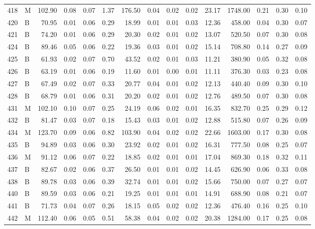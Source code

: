 \begin{table}[ht]
\begin{tabular}{rlrrrrrrrrrrrrr}
  418 & M & 102.90 & 0.08 & 0.07 & 1.37 & 176.50 & 0.04 & 0.02 & 0.02 & 23.17 & 1748.00 & 0.21 & 0.30 & 0.10 \\ 
  420 & B & 70.95 & 0.01 & 0.06 & 0.29 & 18.99 & 0.01 & 0.01 & 0.03 & 12.36 & 458.00 & 0.04 & 0.30 & 0.07 \\ 
  421 & B & 74.20 & 0.01 & 0.06 & 0.29 & 20.30 & 0.02 & 0.01 & 0.02 & 13.07 & 520.50 & 0.07 & 0.30 & 0.08 \\ 
  424 & B & 89.46 & 0.05 & 0.06 & 0.22 & 19.36 & 0.03 & 0.01 & 0.02 & 15.14 & 708.80 & 0.14 & 0.27 & 0.09 \\ 
  425 & B & 61.93 & 0.02 & 0.07 & 0.70 & 43.52 & 0.02 & 0.01 & 0.03 & 11.21 & 380.90 & 0.05 & 0.32 & 0.08 \\ 
  426 & B & 63.19 & 0.01 & 0.06 & 0.19 & 11.60 & 0.01 & 0.00 & 0.01 & 11.11 & 376.30 & 0.03 & 0.23 & 0.08 \\ 
  427 & B & 67.49 & 0.02 & 0.07 & 0.33 & 20.77 & 0.04 & 0.01 & 0.02 & 12.13 & 440.40 & 0.09 & 0.30 & 0.10 \\ 
  428 & B & 68.79 & 0.01 & 0.06 & 0.31 & 20.20 & 0.02 & 0.01 & 0.02 & 12.76 & 489.50 & 0.07 & 0.30 & 0.08 \\ 
  431 & M & 102.10 & 0.10 & 0.07 & 0.25 & 24.19 & 0.06 & 0.02 & 0.01 & 16.35 & 832.70 & 0.25 & 0.29 & 0.12 \\ 
  432 & B & 81.47 & 0.03 & 0.07 & 0.18 & 15.43 & 0.03 & 0.01 & 0.02 & 12.88 & 515.80 & 0.07 & 0.26 & 0.09 \\ 
  434 & M & 123.70 & 0.09 & 0.06 & 0.82 & 103.90 & 0.04 & 0.02 & 0.02 & 22.66 & 1603.00 & 0.17 & 0.30 & 0.08 \\ 
  435 & B & 94.89 & 0.03 & 0.06 & 0.30 & 23.92 & 0.02 & 0.01 & 0.02 & 16.31 & 777.50 & 0.08 & 0.25 & 0.07 \\ 
  436 & M & 91.12 & 0.06 & 0.07 & 0.22 & 18.85 & 0.02 & 0.01 & 0.01 & 17.04 & 869.30 & 0.18 & 0.32 & 0.11 \\ 
  437 & B & 82.67 & 0.02 & 0.06 & 0.37 & 26.50 & 0.01 & 0.01 & 0.02 & 14.45 & 626.90 & 0.06 & 0.33 & 0.08 \\ 
  438 & B & 89.78 & 0.03 & 0.06 & 0.39 & 32.74 & 0.01 & 0.01 & 0.02 & 15.66 & 750.00 & 0.07 & 0.27 & 0.07 \\ 
  440 & B & 89.59 & 0.03 & 0.06 & 0.21 & 19.25 & 0.01 & 0.01 & 0.01 & 14.91 & 688.90 & 0.08 & 0.21 & 0.07 \\ 
  441 & B & 71.73 & 0.04 & 0.07 & 0.26 & 18.15 & 0.05 & 0.02 & 0.02 & 12.36 & 476.40 & 0.16 & 0.25 & 0.10 \\ 
  442 & M & 112.40 & 0.06 & 0.05 & 0.51 & 58.38 & 0.04 & 0.02 & 0.02 & 20.38 & 1284.00 & 0.17 & 0.25 & 0.08 \\ 

\end{tabular}
\end{table}
